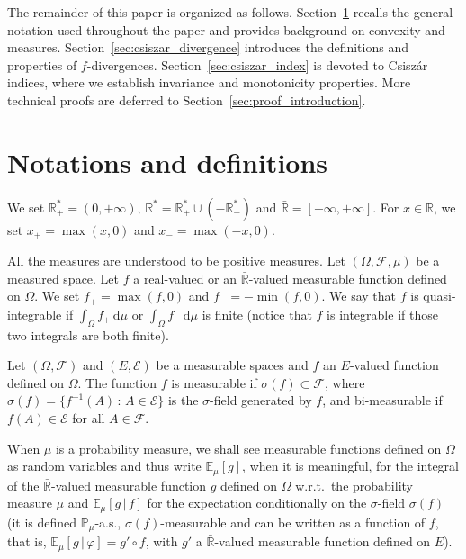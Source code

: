 \documentclass[12pt]{article}
\newcommand{\ce}{{\mathcal E}}
\newcommand{\cf}{{\mathcal F}}
\newcommand{\E}{{\mathbb E}}
\renewcommand{\P}{{\mathbb P}}
\newcommand{\R}{{\mathbb R}}
\newcommand{\rd}{\mathrm{d}}
\theoremstyle{plain}
\theoremstyle{remark}
\begin{document}
The remainder of this paper is organized as follows. 
Section~\ref{sec:general_notation} recalls the general notation used throughout the paper and provides background on convexity and measures. 
Section~\ref{sec:csiszar_divergence} introduces the definitions and properties of $f$-divergences. 
Section~\ref{sec:csiszar_index} is devoted to Csiszár indices, where we establish invariance and monotonicity properties. 
 More technical proofs are deferred to Section~\ref{sec:proof_introduction}.





\section{Notations and definitions}
\label{sec:general_notation}
We  set  $\R^*_+=  (0,  +\infty )$,  $\R^*=\R^*_+  \cup  (-\R^*_+)$  and
$\bar \R=[-\infty , +\infty ]$. For $x\in \R$, we set $x_+=\max(x,0)$
and $x_-=\max(-x, 0)$.

All  the   measures  are   understood  to   be  positive   measures.  Let
$(\Omega, \cf, \mu)$  be a measured space.  Let $f$  a real-valued or an
$\bar  \R$-valued  measurable  function  defined  on  $\Omega$.  We  set
$f_+=  \max(f, 0)$  and  $f_-= -  \min  (f,  0)$.  We  say  that $f$  is
quasi-integrable    if    $\int_\Omega    f_+    \,    \rd    \mu$    or
$\int_\Omega f_- \, \rd \mu$ is finite (notice that $f$ is integrable if
those two integrals are both finite).

Let $(\Omega, \cf)$  and $(E, \ce)$ be a measurable  spaces and $f$
an  $E$-valued   function  defined  on  $\Omega$.    The
function $f$ is measurable if $\sigma(f)\subset \cf$, where
$\sigma(f)=\{  f^{-1}(A)\, \colon\,  A \in  \ce\}$ is  the  $\sigma$-field
generated                 by                $f$, and
bi-measurable if $f(A)\in \ce$ for all $A\in \cf$.


When $\mu$ is  a probability measure, we shall  see measurable functions
defined on $\Omega$ as random variables and thus write $\E_\mu[g]$, when
it is  meaningful, for the  integral of the $\bar  \R$-valued measurable
function $g$ defined  on $\Omega$ w.r.t.\ the  probability measure $\mu$
and $\E_\mu[g\, |\,  f]$ for the expectation  conditionally on the
$\sigma$-field  $\sigma(f)$   (it  is defined  $\P_\mu$-a.s.,
$\sigma(f)$-measurable  and  can  be  written  as  a  function  of
$f$, that is, $\E_\mu[g\, |\, \varphi]=g'\circ f$, with $g'$
a $\bar \R$-valued measurable function defined on $E$).
\end{document}
